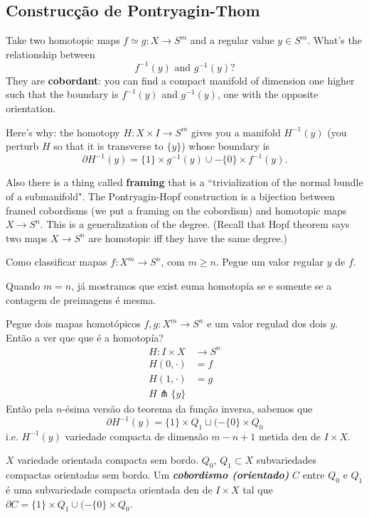 \subsection{Construcção de Pontryagin-Thom}

\begin{upshot}\leavevmode
Take two homotopic maps \(f\simeq g:X \to S^m\) and a regular value \(y \in S^m\). What's the relationship between
\[f^{-1}(y)\text{ and } g^{-1}(y)?\]
They are \textbf{cobordant}: you can find a compact manifold of dimension one higher such that the boundary is \(f^{-1}(y)\) and \(g^{-1}(y)\), one with the opposite orientation.

Here's why: the homotopy \(H:X \times I \to S^m\) gives you a manifold \(H^{-1}(y)\) (you perturb \(H\) so that it is transverse to \(\{y\}\)) whose boundary is  
\[\partial H^{-1}(y)=\{1\}\times g^{-1}(y) \cup -\{0\}\times f^{-1}(y).\]

Also there is a thing called \textbf{framing} that is a ``trivialization of the normal bundle of a submanifold". The Pontryagin-Hopf construction is a bijection between framed cobordisms (we put a framing on the cobordism) and homotopic maps \(X \to S^n\). This is a generalization of the degree. (Recall that Hopf theorem says two maps \(X \to S^n\) are homotopic iff they have the same degree.)
\end{upshot}

Como classificar mapas \(f :X^m \to S^n\), com \(m\geq n\). Pegue um valor regular \(y\) de \(f\). 
\begin{remark}\leavevmode
Quando \(m=n\), já mostramos que exist euma homotopía se e somente se a contagem de preimagens é mesma.
\end{remark}

Pegue dois mapas homotópicos \(f,g:X^m \to S^n\) e um valor regulad dos dois \(y\). Então a ver que que é a homotopía?
\begin{align*}
	H: I\times X &\longrightarrow S^n \\
	H(0,\cdot ) &= f\\
	H(1,\cdot )&=g\\
	H \pitchfork  \{y\} &
\end{align*}
Então pela \(n\)-ésima versão do teorema da função inversa, sabemos que
\[\partial  H^{-1}(y)=\{ 1 \}\times Q_1 \sqcup (-\{ 0\}\times Q_0\]
i.e. \(H^{-1}(y)\) variedade compacta de dimensão \(m-n+1\) metida den de \(I \times X\).

\begin{defn}\leavevmode
\(X\) variedade orientada compacta sem bordo. \(Q_0\), \(Q_1\subset X\) subvariedades compactas orientadas sem bordo. Um \textit{\textbf{cobordismo (orientado)}} \(C\) entre \(Q_0\) e \(Q_1\) é uma subvariedade compacta orientada den de \(I\times X\) tal que \(\partial C=\{1\}\times Q_1 \cup (-\{0\}\times Q_0\).
\end{defn}

